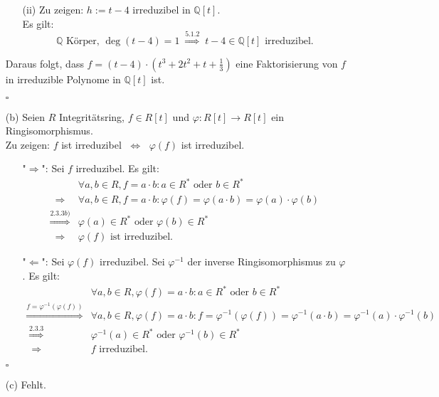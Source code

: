 \documentclass[12pt]{article}
\newcommand{\QED}{\begin{flushright} $\square$ \end{flushright}}
\newcommand{\df}{\enspace\Longrightarrow\enspace}
\newcommand{\gdw}{\;\Longleftrightarrow\;}
\newcommand{\grad}{\operatorname{deg}}
\begin{document}
\begin{enumerate}
\begin{enumerate}
		\item[(ii)] Zu zeigen: $h:=t-4$ irreduzibel in $\mathbb{Q}[t]$. \\
		Es gilt: $$\mathbb{Q}\text{ Körper, }\grad(t-4)=1\overset{5.1.2}{\df}t-4\in\mathbb{Q}[t]\text{ irreduzibel}.$$
	\end{enumerate}
	Daraus folgt, dass $f=\left(t-4\right)\cdot\left(t^3+2t^2+t+\frac{1}{3}\right)$ eine Faktorisierung von $f$ in irreduzible Polynome in $\mathbb{Q}[t]$ ist.
	\QED
	
	\item[(b)] Seien $R$ Integritätsring, $f\in R[t]$ und $\varphi:R[t]\rightarrow R[t]$ ein Ringisomorphismus. \\
	Zu zeigen: $f$ ist irreduzibel $\gdw$ $\varphi(f)$ ist irreduzibel. \\
	\begin{enumerate}
		\item["$\Longrightarrow$":] Sei $f$ irreduzibel. Es gilt:
		\begin{align*}
			&\forall a,b\in R,f=a\cdot b:a\in R^*\text{ oder }b\in R^* \\
			\df&\forall a,b\in R,f=a\cdot b:\varphi(f)=\varphi(a\cdot b)=\varphi(a)\cdot\varphi(b) \\
			\overset{2.3.3b)}{\df}&\varphi(a)\in R^*\text{ oder }\varphi(b)\in R^* \\
			\df&\varphi(f)\text{ ist irreduzibel}.
		\end{align*}
		
		\item["$\Longleftarrow$":] Sei $\varphi(f)$ irreduzibel. Sei $\varphi^{-1}$ der inverse Ringisomorphismus zu $\varphi$. Es gilt:
		\begin{align*}
			&\forall a,b\in R,\varphi(f)=a\cdot b:a\in R^*\text{ oder }b\in R^* \\
			\overset{f=\varphi^{-1}(\varphi(f))}{\df}&\forall a,b\in R,\varphi(f)=a\cdot b:f=\varphi^{-1}(\varphi(f))=\varphi^{-1}(a\cdot b)=\varphi^{-1}(a)\cdot\varphi^{-1}(b) \\
			\overset{2.3.3}{\df}&\varphi^{-1}(a)\in R^*\text{ oder }\varphi^{-1}(b)\in R^* \\
			\df&f\text{ irreduzibel}.
		\end{align*}
	\end{enumerate}
	\QED
	
	\item[(c)] Fehlt.
\end{enumerate}
\end{document}
